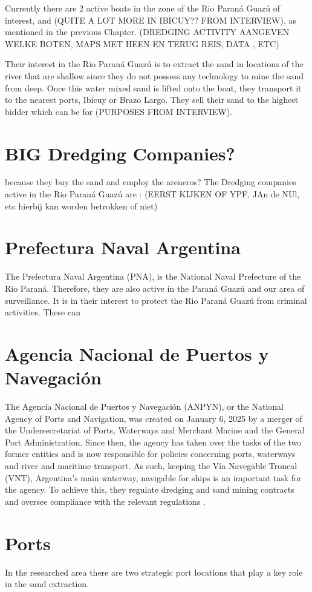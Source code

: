 Currently there are 2 active boats in the zone of the Rio Paraná Guazú of interest, and (QUITE A LOT MORE IN IBICUY?? FROM INTERVIEW), as mentioned in the previous Chapter. (DREDGING ACTIVITY AANGEVEN WELKE BOTEN, MAPS MET HEEN EN TERUG REIS, DATA , ETC)

Their interest in the Rio Paraná Guazú is to extract the sand in locations of the river that are shallow since they do not possess any technology to mine the sand from deep. Once this water mixed sand is lifted onto the boat, they transport it to the nearest ports, Ibicuy or Brazo Largo. They sell their sand to the highest bidder which can be for (PURPOSES FROM INTERVIEW).


\section{BIG Dredging Companies?}
because they buy the sand and employ the areneros?
The Dredging companies active in the Rio Paraná Guazú are :
(EERST KIJKEN OF YPF, JAn de NUl, etc hierbij kan worden betrokken of niet)


\section{Prefectura Naval Argentina}
The Prefectura Naval Argentina (PNA), is the National Naval Prefecture of the Rio Paraná. Therefore, they are also active in the Paraná Guazú and our area of surveillance. 
It is in their interest to protect the Rio Paraná Guazú from criminal activities. These can 

\section{Agencia Nacional de Puertos y Navegación}
The Agencia Nacional de Puertos y Navegación (ANPYN), or the National Agency of Ports and Navigation, was created on January 6, 2025 by a merger of the Undersecretariat of Ports, Waterways and Merchant Marine and the General Port Administration. Since then, the agency has taken over the tasks of the two former entities and is now responsible for policies concerning ports, waterways and river and maritime transport. As such, keeping the Vía Navegable Troncal (VNT), Argentina's main waterway, navigable for ships is an important task for the agency. To achieve this, they regulate dredging and sand mining contracts and oversee compliance with the relevant regulations .

\section{Ports}
In the researched area there are two strategic port locations that play a key role in the sand extraction.

